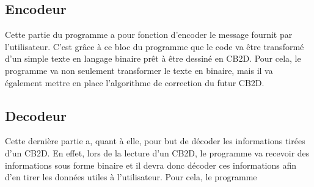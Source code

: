 \subsection{Encodeur}

Cette partie du programme a pour fonction d'encoder le message fournit par l'utilisateur. C'est grâce à ce bloc du programme que le code va être transformé d'un simple texte en langage binaire prêt à être dessiné en CB2D. Pour cela, le programme va non seulement transformer le texte en binaire, mais il va également mettre en place l'algorithme de correction du futur CB2D. 
\subsection{Decodeur}

Cette dernière partie a, quant à elle, pour but de décoder les informations tirées d'un CB2D. 
En effet, lors de la lecture d'un CB2D, le programme va recevoir des informations sous forme binaire et il devra donc décoder ces informations afin d'en tirer les données utiles à l'utilisateur. Pour cela, le programme